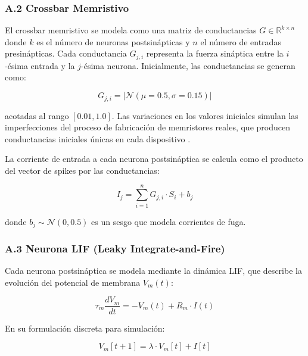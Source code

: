 \subsubsection*{A.2 Crossbar Memristivo}

El crossbar memristivo se modela como una matriz de conductancias $G \in \mathbb{R}^{k \times n}$ donde $k$ es el número de neuronas postsinápticas y $n$ el número de entradas presinápticas. Cada conductancia $G_{j,i}$ representa la fuerza sináptica entre la $i$-ésima entrada y la $j$-ésima neurona. Inicialmente, las conductancias se generan como:

\begin{equation}
    G_{j,i} = |\mathcal{N}(\mu=0.5, \sigma=0.15)|
    \label{eq:cond_init}
\end{equation}

acotadas al rango $[0.01, 1.0]$. Las variaciones en los valores iniciales simulan las imperfecciones del proceso de fabricación de memristores reales, que producen conductancias iniciales únicas en cada dispositivo \cite{rajan2020memristor}.

La corriente de entrada a cada neurona postsináptica se calcula como el producto del vector de spikes por las conductancias:

\begin{equation}
    I_j = \sum_{i=1}^{n} G_{j,i} \cdot S_i + b_j
    \label{eq:current}
\end{equation}

donde $b_j \sim \mathcal{N}(0, 0.5)$ es un sesgo que modela corrientes de fuga.

\subsubsection*{A.3 Neurona LIF (Leaky Integrate-and-Fire)}

Cada neurona postsináptica se modela mediante la dinámica LIF, que describe la evolución del potencial de membrana $V_m(t)$:

\begin{equation}
    \tau_m \frac{dV_m}{dt} = -V_m(t) + R_m \cdot I(t)
    \label{eq:lif}
\end{equation}

En su formulación discreta para simulación:

\begin{equation}
    V_m[t+1] = \lambda \cdot V_m[t] + I[t]
    \label{eq:lif_discrete}
\end{equation}

